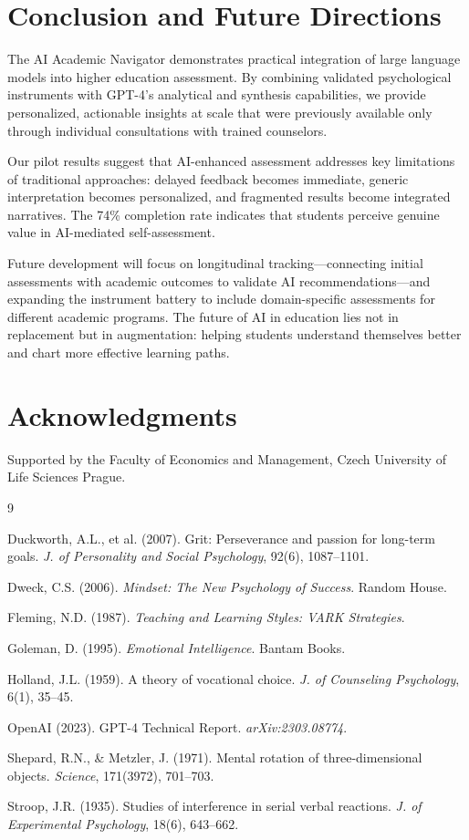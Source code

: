 \documentclass[11pt,a4paper]{article}
\begin{document}
\section{Conclusion and Future Directions}

The AI Academic Navigator demonstrates practical integration of large language models into higher education assessment. By combining validated psychological instruments with GPT-4's analytical and synthesis capabilities, we provide personalized, actionable insights at scale that were previously available only through individual consultations with trained counselors.

Our pilot results suggest that AI-enhanced assessment addresses key limitations of traditional approaches: delayed feedback becomes immediate, generic interpretation becomes personalized, and fragmented results become integrated narratives. The 74\% completion rate indicates that students perceive genuine value in AI-mediated self-assessment.

Future development will focus on longitudinal tracking---connecting initial assessments with academic outcomes to validate AI recommendations---and expanding the instrument battery to include domain-specific assessments for different academic programs. The future of AI in education lies not in replacement but in augmentation: helping students understand themselves better and chart more effective learning paths.

\section*{Acknowledgments}
Supported by the Faculty of Economics and Management, Czech University of Life Sciences Prague.

\begin{thebibliography}{9}

Duckworth, A.L., et al. (2007).
Grit: Perseverance and passion for long-term goals.
\emph{J. of Personality and Social Psychology}, 92(6), 1087--1101.

Dweck, C.S. (2006).
\emph{Mindset: The New Psychology of Success}. Random House.

Fleming, N.D. (1987).
\emph{Teaching and Learning Styles: VARK Strategies}.

Goleman, D. (1995).
\emph{Emotional Intelligence}. Bantam Books.

Holland, J.L. (1959).
A theory of vocational choice.
\emph{J. of Counseling Psychology}, 6(1), 35--45.

OpenAI (2023).
GPT-4 Technical Report. \emph{arXiv:2303.08774}.

Shepard, R.N., \& Metzler, J. (1971).
Mental rotation of three-dimensional objects.
\emph{Science}, 171(3972), 701--703.

Stroop, J.R. (1935).
Studies of interference in serial verbal reactions.
\emph{J. of Experimental Psychology}, 18(6), 643--662.

\end{thebibliography}
\end{document}
